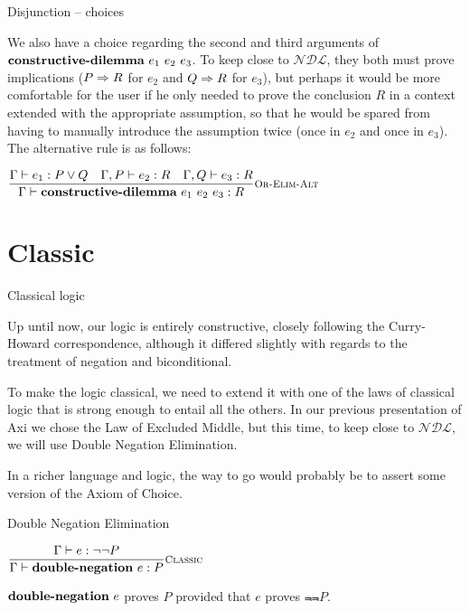 \documentclass{beamer}
\newcommand{\NDL}{\mathcal{NDL}}
\begin{document}
\begin{frame}{Disjunction -- choices}

We also have a choice regarding the second and third arguments of $\textbf{constructive-dilemma}\ e_1\ e_2\ e_3$. To keep close to $\NDL$, they both must prove implications ($P \Rightarrow R$ for $e_2$ and $Q \Rightarrow R$ for $e_3$), but perhaps it would be more comfortable for the user if he only needed to prove the conclusion $R$ in a context extended with the appropriate assumption, so that he would be spared from having to manually introduce the assumption twice (once in $e_2$ and once in $e_3$). The alternative rule is as follows:

\vspace{2em}

\begin{center}
  $\infrule[Or-Elim-Alt]{\proves{e_1}{\Or{P}{Q}} \quad \proves[\assume{\Gamma}{P}]{e_2}{R} \quad \proves[\assume{\Gamma}{Q}]{e_3}{R}}{\proves{\orelim{e_1}{e_2}{e_3}}{R}}$
\end{center}

\end{frame}

\section{Classic}

\begin{frame}{Classical logic}

Up until now, our logic is entirely constructive, closely following the Curry-Howard correspondence, although it differed slightly with regards to the treatment of negation and biconditional.

\vspace{2em}

To make the logic classical, we need to extend it with one of the laws of classical logic that is strong enough to entail all the others. In our previous presentation of Axi we chose the Law of Excluded Middle, but this time, to keep close to $\NDL$, we will use Double Negation Elimination.

\vspace{2em}

In a richer language and logic, the way to go would probably be to assert some version of the Axiom of Choice.

\end{frame}

\begin{frame}{Double Negation Elimination}

\begin{center}
  $\infrule[Classic]{\proves{e}{\Not{\Not{P}}}}{\proves{\dn[e]}{P}}$
\end{center}

\vspace{2em}

$\dn[e]$ proves $P$ provided that $e$ proves $\Not{\Not{P}}$.

\end{frame}
\end{document}
